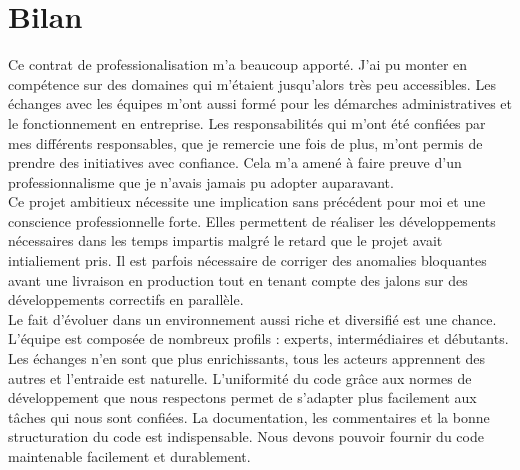 \documentclass[12pt,a4paper]{article}
\begin{document}
\section{Bilan}
Ce contrat de professionalisation m'a beaucoup apporté. J'ai pu monter en compétence sur des domaines qui m'étaient jusqu'alors très peu accessibles. Les échanges avec les équipes m'ont aussi formé pour les démarches administratives et le fonctionnement en entreprise. Les responsabilités qui m'ont été confiées par mes différents responsables, que je remercie une fois de plus, m'ont permis de prendre des initiatives avec confiance. Cela m'a amené à faire preuve d'un professionnalisme que je n'avais jamais pu adopter auparavant.\\
Ce projet ambitieux nécessite une implication sans précédent pour moi et une conscience professionnelle forte. Elles permettent de réaliser les développements nécessaires dans les temps impartis malgré le retard que le projet avait intialiement pris. Il est parfois nécessaire de corriger des anomalies bloquantes avant une livraison en production tout en tenant compte des jalons sur des développements correctifs en parallèle.\\
Le fait d'évoluer dans un environnement aussi riche et diversifié est une chance. L'équipe est composée de nombreux profils : experts, intermédiaires et débutants. Les échanges n'en sont que plus enrichissants, tous les acteurs apprennent des autres et l'entraide est naturelle.
L'uniformité du code grâce aux normes de développement que nous respectons permet de s'adapter plus facilement aux tâches qui nous sont confiées.
La documentation, les commentaires et la bonne structuration du code est indispensable. Nous devons pouvoir fournir du code maintenable facilement et durablement.
\newpage
\clearpage
\end{document}
